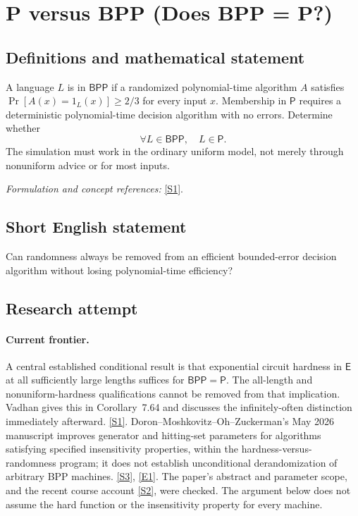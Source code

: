 \documentclass[11pt,a4paper]{article}
\newcommand{\sref}[2]{\hyperlink{source:#1:#2}{[S#2]}}
\newcommand{\eref}[2]{\hyperlink{extra:#1:#2}{[E#2]}}
\newif\ifshowcatalogue
\newcommand{\cataloguescope}[1]{\ifshowcatalogue
 \paragraph{Exact scope in the supplied catalogue.}
 \begin{quote}\small #1\end{quote}\fi}
\numberwithin{equation}{section}
\begin{document}
\setcounter{section}{26}
\clearpage
\section{\texorpdfstring{P versus BPP (Does BPP = P?)}{P versus BPP (Does BPP = P?)}}\label{27}
\subsection{Definitions and mathematical statement}
A language $L$ is in $\mathsf{BPP}$ if a randomized polynomial-time algorithm $A$ satisfies $\Pr[A(x)=1_L(x)]\ge2/3$ for every input $x$. Membership in $\mathsf P$ requires a deterministic polynomial-time decision algorithm with no errors. Determine whether
\[
 \forall L\in\mathsf{BPP},\quad L\in\mathsf P.
\]
The simulation must work in the ordinary uniform model, not merely through nonuniform advice or for most inputs.
\par\smallskip\textit{Formulation and concept references:} \sref{27}{1}.
\cataloguescope{Determine whether every language computable by a probabilistic polynomial-time algorithm with bounded two-sided error (BPP) can be computed by a deterministic polynomial-time algorithm, i.e., whether BPP = P.}
\subsection{Short English statement}
Can randomness always be removed from an efficient bounded-error decision algorithm without losing polynomial-time efficiency?
\subsection{Research attempt}

\paragraph{Current frontier.}
A central established conditional result is that exponential circuit
hardness in $\mathsf E$ at all sufficiently large lengths suffices for
$\mathsf{BPP}=\mathsf P$. The all-length and nonuniform-hardness
qualifications cannot be removed from that implication. Vadhan gives
this in Corollary~7.64 and discusses the infinitely-often distinction
immediately afterward. \sref{27}{1}. Doron--Moshkovitz--Oh--Zuckerman's
May 2026 manuscript improves generator and hitting-set parameters for
algorithms satisfying specified insensitivity properties, within the
hardness-versus-randomness program; it does not establish unconditional
derandomization of arbitrary BPP machines. \sref{27}{3}, \eref{27}{1}.
The paper's abstract and parameter scope, and the recent course account
\sref{27}{2}, were checked. The argument below does not assume the hard
function or the insensitivity property for every machine.
\end{document}
